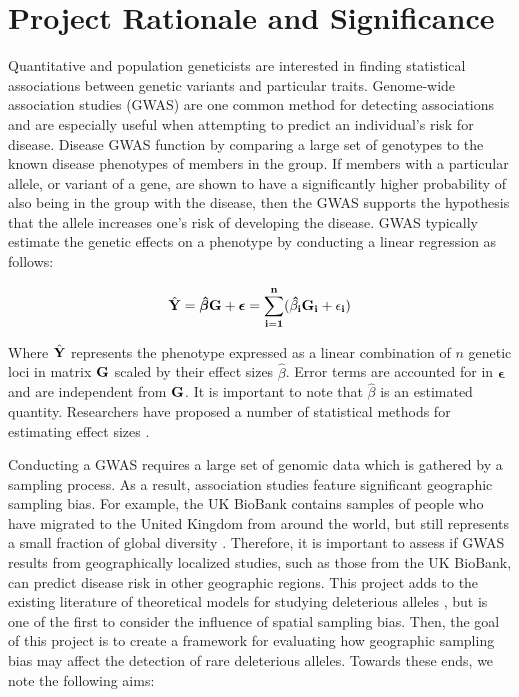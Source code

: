 \section{Project Rationale and Significance}
Quantitative and population geneticists are interested in finding statistical associations between genetic variants and particular traits. Genome-wide association studies (GWAS) are one common method for detecting associations and are especially useful when attempting to predict an individual’s risk for disease. Disease GWAS function by comparing a large set of genotypes to the known disease phenotypes of members in the group. If members with a particular allele, or variant of a gene, are shown to have a significantly higher probability of also being in the group with the disease, then the GWAS supports the hypothesis that the allele increases one’s risk of developing the disease. GWAS typically estimate the genetic effects on a phenotype by conducting a linear regression as follows:\cite{dudbridge_power_2013} \cite{xie_efficiency_1998}

\begin{equation}
    \hat{\bf{Y}} = \boldsymbol{\hat{\beta}} \bf{G} + \boldsymbol{\epsilon} = \sum_{i=1}^{n} (\hat{\beta_i} G_i + \epsilon_i) 
\end{equation}

Where $\hat{\bf{Y}}$ represents the phenotype expressed as a linear combination of $n$ genetic loci in matrix $\bf{G}$ scaled by their effect sizes $\hat{\beta}$. Error terms are accounted for in $\boldsymbol{\epsilon}$ and are independent from $\bf{G}$. It is important to note that $\hat{\beta}$ is an estimated quantity. Researchers have proposed a number of statistical methods for estimating effect sizes \cite{meuwissen_prediction_2001} \cite{park_distribution_2011}.



Conducting a GWAS requires a large set of genomic data which is gathered by a sampling process. As a result, association studies feature significant geographic sampling bias. For example, the UK BioBank contains samples of people who have migrated to the United Kingdom from around the world, but still represents a small fraction of global diversity \cite{bycroft_uk_2018}. Therefore, it is important to assess if GWAS results from geographically localized studies, such as those from the UK BioBank, can predict disease risk in other geographic regions. This project adds to the existing literature of theoretical models for studying deleterious alleles \cite{eyre-walker_evolution_2010} \cite{pritchard_are_2001}\cite{simons_population_2018}, but is one of the first to consider the influence of spatial sampling bias. Then, the goal of this project is to create a framework for evaluating how geographic sampling bias may affect the detection of rare deleterious alleles. Towards these ends, we note the following aims:	

